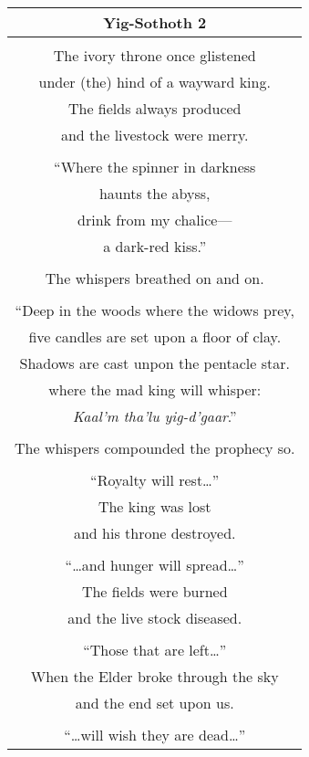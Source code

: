 \documentclass{article}
\begin{document}
\begin{center}
\begin{tabular}{c}
\textbf{Yig-Sothoth 2} \\ \hline
\\
The ivory throne once glistened \\
under (the) hind of a wayward king. \\
The fields always produced \\
and the livestock were merry. \\
\\
``Where the spinner in darkness \\
haunts the abyss, \\
drink from my chalice--- \\
a dark-red kiss.'' \\
\\
The whispers breathed on and on. \\
\\
``Deep in the woods where the widows prey, \\
five candles are set upon a floor of clay. \\
Shadows are cast unpon the pentacle star. \\
where the mad king will whisper: \\
\textit{Kaal'm tha'lu yig-d'gaar}.'' \\
\\
The whispers compounded the prophecy so. \\
\\
``Royalty will rest\ldots{}''
\\
The king was lost \\
and his throne destroyed. \\
\\
``\ldots{}and hunger will spread\ldots{}''
\\
The fields were burned \\
and the live stock diseased. \\
\\
``Those that are left\ldots{}''
\\
When the Elder broke through the sky \\
and the end set upon us. \\
\\
``\ldots{}will wish they are dead\ldots{}''
\\

\end{tabular}
\end{center}
\end{document}
